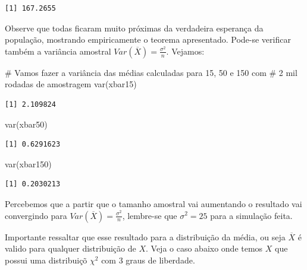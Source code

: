 \documentclass[
  letterpaper,
  DIV=11,
  numbers=noendperiod]{scrartcl}
\newenvironment{Shaded}{\begin{snugshade}}{\end{snugshade}}
\newcommand{\CommentTok}[1]{\textcolor[rgb]{0.37,0.37,0.37}{#1}}
\newcommand{\FunctionTok}[1]{\textcolor[rgb]{0.28,0.35,0.67}{#1}}
\newcommand{\NormalTok}[1]{\textcolor[rgb]{0.00,0.23,0.31}{#1}}
\begin{document}
\begin{verbatim}
[1] 167.2655
\end{verbatim}

Observe que todas ficaram muito próximas da verdadeira esperança da
população, mostrando empiricamente o teorema apresentado. Pode-se
verificar também a variância amostral
\(Var(\overline{X})=\frac{\sigma^{2}}{n}\). Vejamos:\\

\begin{Shaded}
\begin{Highlighting}[]
\CommentTok{\# Vamos fazer a variância das médias calculadas para 15, 50 e 150 com }
  \CommentTok{\# 2 mil rodadas de amostragem}
\FunctionTok{var}\NormalTok{(xbar15)}
\end{Highlighting}
\end{Shaded}

\begin{verbatim}
[1] 2.109824
\end{verbatim}

\begin{Shaded}
\begin{Highlighting}[]
\FunctionTok{var}\NormalTok{(xbar50)}
\end{Highlighting}
\end{Shaded}

\begin{verbatim}
[1] 0.6291623
\end{verbatim}

\begin{Shaded}
\begin{Highlighting}[]
\FunctionTok{var}\NormalTok{(xbar150)}
\end{Highlighting}
\end{Shaded}

\begin{verbatim}
[1] 0.2030213
\end{verbatim}

\hfill\break
Percebemos que a partir que o tamanho amostral vai aumentando o
resultado vai convergindo para
\(Var(\overline{X})=\frac{\sigma^{2}}{n}\), lembre-se que
\(\sigma^{2}=25\) para a simulação feita.

Importante ressaltar que esse resultado para a distribuição da média, ou
seja \(\overline{X}\) é valido para qualquer distribuição de \(X\). Veja
o caso abaixo onde temos \(X\) que possui uma distribuiçõ \(\chi^2\) com
3 graus de liberdade.
\end{document}
